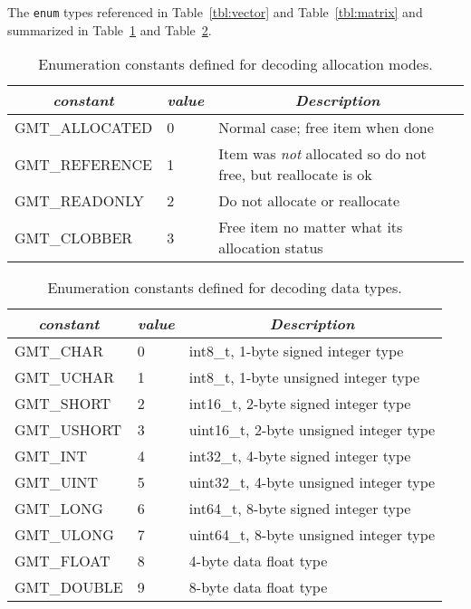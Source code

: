 \documentclass[11pt]{report}
\begin{document}
The \texttt{enum} types referenced in Table~\ref{tbl:vector} and Table~\ref{tbl:matrix} and summarized in Table~\ref{tbl:enums}
and Table~\ref{tbl:types}.
\begin{table}[h]
\small
\centering
\begin{tabular}{|l|l|l|} \hline
\multicolumn{1}{|c|}{\emph{constant}} & \multicolumn{1}{c|}{\emph{value}}  & \multicolumn{1}{c|}{\emph{Description}} \\ \hline
GMT\_ALLOCATED		&      0	& Normal case; free item when done \\ \hline
GMT\_REFERENCE		&      1	& Item was \emph{not} allocated so do not free, but reallocate is ok \\ \hline
GMT\_READONLY		&      2	& Do not allocate or reallocate \\ \hline
GMT\_CLOBBER		&      3	& Free item no matter what its allocation status \\ \hline
\end{tabular}
\caption{Enumeration constants defined for decoding allocation modes.}
\label{tbl:enums}
\end{table}

\begin{table}[h]
\small
\centering
\begin{tabular}{|l|l|l|} \hline
\multicolumn{1}{|c|}{\emph{constant}} & \multicolumn{1}{c|}{\emph{value}}  & \multicolumn{1}{c|}{\emph{Description}} \\ \hline
GMT\_CHAR	&      0	& int8\_t, 1-byte signed integer type \\ \hline
GMT\_UCHAR	&      1	& int8\_t, 1-byte unsigned integer type \\ \hline
GMT\_SHORT	&      2	& int16\_t, 2-byte signed integer type \\ \hline
GMT\_USHORT	&      3	& uint16\_t, 2-byte unsigned integer type \\ \hline
GMT\_INT	&      4	& int32\_t, 4-byte signed integer type \\ \hline
GMT\_UINT	&      5	& uint32\_t, 4-byte unsigned integer type \\ \hline
GMT\_LONG	&      6	& int64\_t, 8-byte signed integer type \\ \hline
GMT\_ULONG	&      7	& uint64\_t, 8-byte unsigned integer type \\ \hline
GMT\_FLOAT	&      8	& 4-byte data float type \\ \hline
GMT\_DOUBLE	&      9	& 8-byte data float type \\ \hline
\end{tabular}
\caption{Enumeration constants defined for decoding data types.}
\label{tbl:types}
\end{table}
\end{document}
